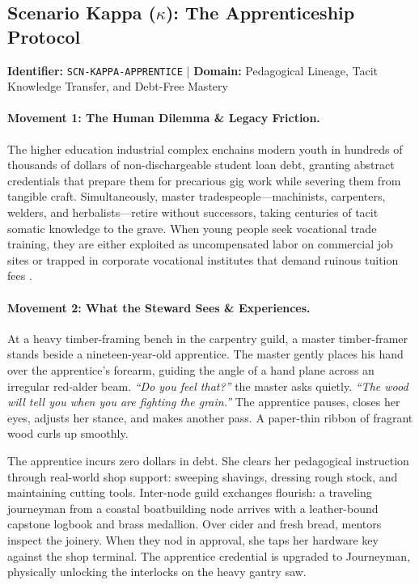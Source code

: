 \subsection{Scenario Kappa (\texorpdfstring{$\kappa$}{Kappa}): The Apprenticeship Protocol}
\label{subsec:scn_kappa}
\textbf{Identifier:} \texttt{SCN-KAPPA-APPRENTICE} \quad | \quad \textbf{Domain:} Pedagogical Lineage, Tacit Knowledge Transfer, and Debt-Free Mastery

\paragraph{Movement 1: The Human Dilemma \& Legacy Friction.}
The higher education industrial complex enchains modern youth in hundreds of thousands of dollars of non-dischargeable student loan debt, granting abstract credentials that prepare them for precarious gig work while severing them from tangible craft. Simultaneously, master tradespeople---machinists, carpenters, welders, and herbalists---retire without successors, taking centuries of tacit somatic knowledge to the grave. When young people seek vocational trade training, they are either exploited as uncompensated labor on commercial job sites or trapped in corporate vocational institutes that demand ruinous tuition fees \parencite{alamo1985}.

\paragraph{Movement 2: What the Steward Sees \& Experiences.}
At a heavy timber-framing bench in the carpentry guild, a master timber-framer stands beside a nineteen-year-old apprentice. The master gently places his hand over the apprentice's forearm, guiding the angle of a hand plane across an irregular red-alder beam. \textit{``Do you feel that?''} the master asks quietly. \textit{``The wood will tell you when you are fighting the grain.''} The apprentice pauses, closes her eyes, adjusts her stance, and makes another pass. A paper-thin ribbon of fragrant wood curls up smoothly. 

The apprentice incurs zero dollars in debt. She clears her pedagogical instruction through real-world shop support: sweeping shavings, dressing rough stock, and maintaining cutting tools. Inter-node guild exchanges flourish: a traveling journeyman from a coastal boatbuilding node arrives with a leather-bound capstone logbook and brass medallion. Over cider and fresh bread, mentors inspect the joinery. When they nod in approval, she taps her hardware key against the shop terminal. The apprentice credential is upgraded to Journeyman, physically unlocking the interlocks on the heavy gantry saw.

